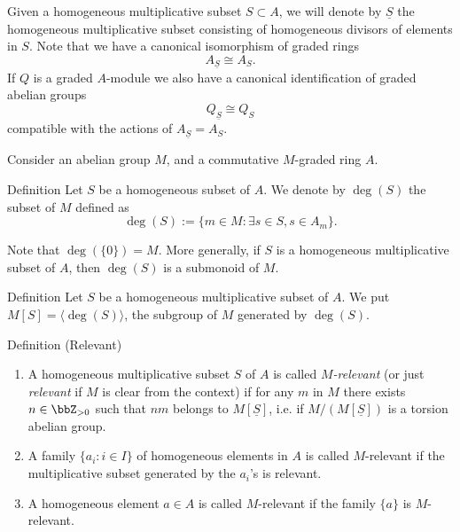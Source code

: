 \documentclass[9pt]{beamer}
\begin{document}
\begin{frame}

Given a homogeneous multiplicative subset $S \subset A$, we will denote by $\underline{S}$ the homogeneous multiplicative subset consisting of homogeneous divisors of elements in $S$. Note that we have a canonical isomorphism of graded rings
\begin{equation}
\label{eqn:isom-localizations}
 A_{ \underline{S}} \cong A_{S}.
\end{equation}
If $Q$ is a graded $A$-module we also have a canonical identification of graded abelian groups 
\begin{equation}
\label{eqn:isom-localizations-modules}
Q_{\underline{S}} \cong Q_S
\end{equation}
compatible with the actions of $A_{ \underline{S}} = A_{S}$.

\end{frame}


\begin{frame}


Consider an abelian group $M$, and a commutative $M$-graded ring $A$. 

 \begin{block}{Definition}
 Let $S$ be a homogeneous subset of $A$. We denote by $\deg(S)$ the subset of $M$ defined as 
\[\deg(S):= \{ m \in M : \exists s \in S , s  \in A_m \}. \]
 \end{block} 
Note that $\deg(\{0\})=M$.
More generally, if $S$ is a homogeneous multiplicative subset of $A$, then $\deg(S)$ is a submonoid of $M$.

\begin{block}{Definition}
Let $S$ be a homogeneous multiplicative subset of $A$. 
 We put $M[S]= \langle \deg (S) \rangle $, the subgroup of $M$ generated by $\deg(S)$.

\end{block}


\begin{block}{Definition (Relevant)}
\begin{enumerate} \item 
 A homogeneous multiplicative subset $S$ of $A$ is called \emph{$M$-relevant} (or just \emph{relevant} if $M$ is clear from the context) if for any $m$ in $M$ there exists $n \in \bbZ_{> 0}$ such that $nm$ belongs to $M[\underline{S}]$, i.e. if $M/(M[\underline{S}])$ is a torsion abelian group.

 \item
 A family $\{a_i : i \in I\}$ of homogeneous elements in $A$ is called $M$-relevant if the multiplicative subset generated by the $a_i$'s is relevant.
 \item
 A homogeneous element $a \in A$ is called $M$-relevant if the family $\{a\}$ is $M$-relevant.
\end{enumerate}\end{block}

\end{frame}
\end{document}
